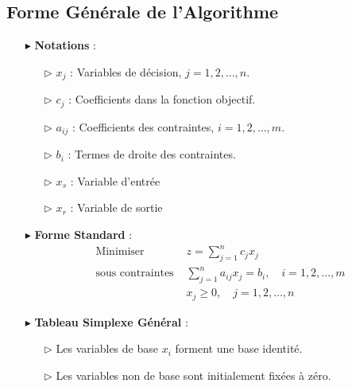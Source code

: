 \documentclass{report}
\begin{document}
\begin{multicols*}{2}
\section{Forme Générale de l'Algorithme}

    \begin{itemize}
        \item[$\blacktriangleright$] \textbf{Notations} :
            \begin{itemize}
                \item[$\rhd$] \( x_j \) : Variables de décision, \( j = 1, 2, \dots, n \).
                \item[$\rhd$] \( c_j \) : Coefficients dans la fonction objectif.
                \item[$\rhd$] \( a_{ij} \) : Coefficients des contraintes, \( i = 1, 2, \dots, m \).
                \item[$\rhd$] \( b_i \) : Termes de droite des contraintes.
                \item[$\rhd$] \( x_s \) : Variable d'entrée
                \item[$\rhd$] \( x_r \) : Variable de sortie
            \end{itemize}


        \item[$\blacktriangleright$] \textbf{Forme Standard} :
        \[%
            \begin{aligned}
            &\text{Minimiser } & z = \sum_{j=1}^{n} c_j x_j \\
            &\text{sous contraintes } & \sum_{j=1}^{n} a_{ij} x_j = b_i, \quad i = 1, 2, \dots, m \\
            & & x_j \geq 0, \quad j = 1, 2, \dots, n
            \end{aligned}
        \]%

        \item[$\blacktriangleright$] \textbf{Tableau Simplexe Général} :
            \begin{itemize}
                \item[$\rhd$] Les variables de base \( x_i \) forment une base identité.
                \item[$\rhd$] Les variables non de base sont initialement fixées à zéro.
            \end{itemize}


\end{itemize}
\end{multicols*}
\end{document}
